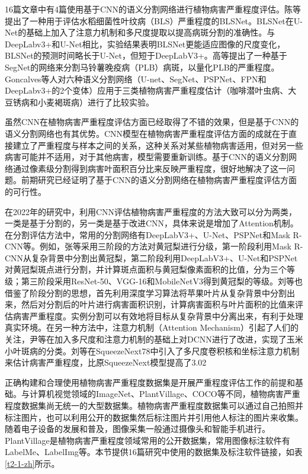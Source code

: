 16篇文章中有4篇使用基于CNN的语义分割网络进行植物病害严重程度评估。陈等提出了一种用于评估水稻细菌性叶纹病（BLS）严重程度的BLSNet。BLSNet在U-Net的基础上加入了注意力机制和多尺度提取以提高病斑分割的准确性。与DeepLabv3+和U-Net相比，实验结果表明BLSNet更能适应图像的尺度变化，BLSNet的预测时间略长于U-Net，但短于DeepLabV3+。高等提出了一种基于SegNet的网络来分割马铃薯晚疫病（PLB）病斑，以量化PLB的严重程度。Goncalves等人对六种语义分割网络（U-net、SegNet、PSPNet、FPN和DeepLabv3+的2个变体）应用于三类植物病害严重程度估计（咖啡潜叶虫病、大豆锈病和小麦褐斑病）进行了比较实验。

虽然CNN在植物病害严重程度评估方面已经取得了不错的效果，但是基于CNN的语义分割网络也有其优势。CNN模型在植物病害严重程度评估方面的成就在于直接建立了严重程度与样本之间的关系，这种关系对某些植物病害适用，但对另一些病害可能并不适用，对于其他病害，模型需要重新训练。基于CNN的语义分割网络通过像素级分割得到病害叶面积百分比来反映严重程度，很好地解决了这一问题。前期研究已经证明了基于CNN的语义分割网络在植物病害严重程度评估方面的可行性。

在2022年的研究中，利用CNN评估植物病害严重程度的方法大致可以分为两类，一类是基于分割的，另一类是基于改进CNN，具体来说是增加了Attention机制。在分割评估方法中，常用的分割网络有DeepLabV3+、U-Net、PSPNet和Mask R-CNN等。例如，张等采用三阶段的方法对黄冠梨进行分级，第一阶段利用Mask R-CNN从复杂背景中分割出黄冠梨，第二阶段利用DeepLabV3+、U-Net和PSPNet对黄冠梨斑点进行分割，并计算斑点面积与黄冠梨像素面积的比值，分为三个等级；第三阶段采用ResNet-50、VGG-16和MobileNetV3得到黄冠梨的等级。刘等也借鉴了阶段分割的思想，首先利用深度学习算法将苹果叶片从复杂背景中分割出来，然后对分割后的叶片进行病害面积识别，计算病害面积与叶片面积的比值来评估病害严重程度。实例分割可以有效地将目标从复杂背景中分离出来，有利于处理真实环境。在另一种方法中，注意力机制（Attention Mechanism）引起了人们的关注，尹等在加入多尺度和注意力机制的基础上对DCNN进行了改进，实现了玉米小叶斑病的分类。刘等在SqueezeNext78中引入了多尺度卷积核和坐标注意力机制来估计病害严重程度，比原SqueezeNext模型提高了3.02%

正确构建和合理使用植物病害严重程度数据集是开展严重程度评估工作的前提和基础。与计算机视觉领域的ImageNet、PlantVillage、COCO等不同，植物病害严重程度数据集尚无统一的大型数据集。植物病害严重程度数据集可以通过自己拍照并标注图片，也可以利用公开的数据集然后标注图片并引用他人标注的图片来收集。随着电子设备的发展和普及，图像采集一般通过摄像头和智能手机进行。PlantVillage是植物病害严重程度领域常用的公开数据集，常用图像标注软件有LabelMe、LabelImg等。本节提供16篇研究中使用的数据集及标注软件链接，如表\ref{t2-1-zh}所示。

